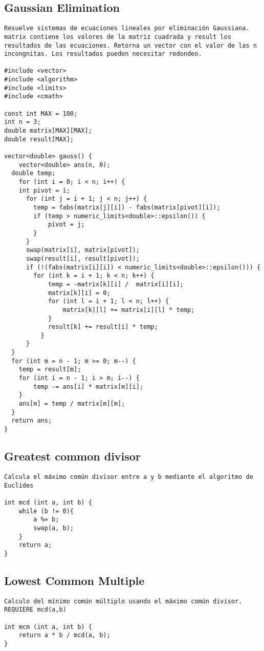 \documentclass[10pt,letterpaper,twocolumn,twosided]{article}
\begin{document}
\subsection{Gaussian Elimination}
\begin{lstlisting}
Resuelve sistemas de ecuaciones lineales por eliminación Gaussiana.  matrix contiene los valores de la matriz cuadrada y result los resultados de las ecuaciones. Retorna un vector con el valor de las n incongnitas. Los resultados pueden necesitar redondeo.

#include <vector>
#include <algorithm>
#include <limits>
#include <cmath>

const int MAX = 100;
int n = 3;
double matrix[MAX][MAX];
double result[MAX];

vector<double> gauss() {
	vector<double> ans(n, 0);
  double temp;
	for (int i = 0; i < n; i++) {
    int pivot = i;
	  for (int j = i + 1; j < n; j++) {
	   	temp = fabs(matrix[j][i]) - fabs(matrix[pivot][i]);
	    if (temp > numeric_limits<double>::epsilon()) {
	     	pivot = j;
	    }
	  }  
	  swap(matrix[i], matrix[pivot]);
	  swap(result[i], result[pivot]);
	  if (!(fabs(matrix[i][i]) < numeric_limits<double>::epsilon())) {
	    for (int k = i + 1; k < n; k++) {
		    temp = -matrix[k][i] /  matrix[i][i];
		    matrix[k][i] = 0;
		    for (int l = i + 1; l < n; l++) {
		    	matrix[k][l] += matrix[i][l] * temp;
		    }
		  	result[k] += result[i] * temp;
		  }
	  }
  }
  for (int m = n - 1; m >= 0; m--) {
   	temp = result[m];
   	for (int i = n - 1; i > m; i--) {
   		temp -= ans[i] * matrix[m][i];
   	}
   	ans[m] = temp / matrix[m][m];
  }
  return ans;
}
\end{lstlisting}

\subsection{Greatest common divisor}
\begin{lstlisting}
Calcula el máximo común divisor entre a y b mediante el algoritmo de Euclides

int mcd (int a, int b) {
	while (b != 0){
		a %= b;
		swap(a, b);
	}
	return a;
}\end{lstlisting}

\subsection{Lowest Common Multiple}
\begin{lstlisting}
Calculo del mínimo común múltiplo usando el máximo común divisor. REQUIERE mcd(a,b)

int mcm (int a, int b) {
	return a * b / mcd(a, b);
}
\end{lstlisting}
\end{document}
